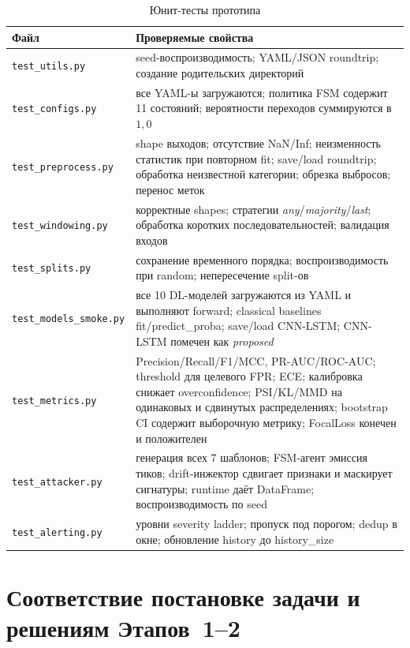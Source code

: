 \documentclass[14pt, a4paper]{extarticle}
\begin{document}
\begin{table}[H]
\centering
\caption{Юнит-тесты прототипа}
\label{tab:tests}
\renewcommand{\arraystretch}{1.2}
\small
\begin{tabularx}{\linewidth}{@{}lX@{}}
\toprule
\textbf{Файл} & \textbf{Проверяемые свойства} \\
\midrule
\texttt{test\_utils.py}    & seed-воспроизводимость; YAML/JSON roundtrip; создание родительских директорий \\
\texttt{test\_configs.py}  & все YAML-ы загружаются; политика FSM содержит 11 состояний; вероятности переходов суммируются в \(1{,}0\) \\
\texttt{test\_preprocess.py} & shape выходов; отсутствие NaN/Inf; неизменность статистик при повторном fit; save/load roundtrip; обработка неизвестной категории; обрезка выбросов; перенос меток \\
\texttt{test\_windowing.py} & корректные shapes; стратегии \emph{any}/\emph{majority}/\emph{last}; обработка коротких последовательностей; валидация входов \\
\texttt{test\_splits.py}    & сохранение временного порядка; воспроизводимость при random; непересечение split-ов \\
\texttt{test\_models\_smoke.py} & все 10 DL-моделей загружаются из YAML и выполняют forward; classical baselines fit/predict\_proba; save/load CNN-LSTM; CNN-LSTM помечен как \emph{proposed} \\
\texttt{test\_metrics.py}  & Precision/Recall/F1/MCC, PR-AUC/ROC-AUC; threshold для целевого FPR; ECE; калибровка снижает overconfidence; PSI/KL/MMD на одинаковых и сдвинутых распределениях; bootstrap CI содержит выборочную метрику; FocalLoss конечен и положителен \\
\texttt{test\_attacker.py} & генерация всех 7 шаблонов; FSM-агент эмиссия тиков; drift-инжектор сдвигает признаки и маскирует сигнатуры; runtime даёт DataFrame; воспроизводимость по seed \\
\texttt{test\_alerting.py} & уровни severity ladder; пропуск под порогом; dedup в окне; обновление history до history\_size \\
\bottomrule
\end{tabularx}
\end{table}

\section{Соответствие постановке задачи и решениям Этапов~1--2}
\end{document}
